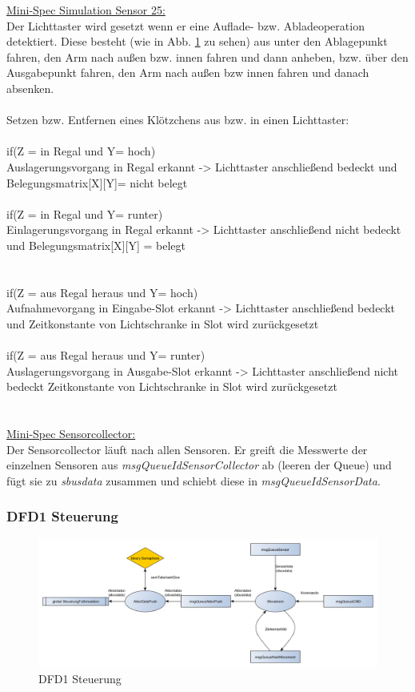 \underline{Mini-Spec Simulation Sensor 25:}\\
Der Lichttaster wird gesetzt wenn er eine Auflade- bzw. Abladeoperation detektiert. Diese besteht (wie in Abb. \ref{fig3} zu sehen) aus unter den Ablagepunkt fahren, den Arm nach außen bzw. innen fahren und dann anheben, bzw. über den Ausgabepunkt fahren, den Arm nach außen bzw innen fahren und danach absenken.\\ \\
Setzen bzw. Entfernen eines Klötzchens aus bzw. in einen Lichttaster:\\ \\
if(Z = in Regal und Y= hoch) \\
Auslagerungsvorgang in Regal erkannt -> Lichttaster anschließend bedeckt und Belegungsmatrix[X][Y]= nicht belegt\\
\\
if(Z = in Regal und Y= runter)\\
Einlagerungsvorgang in Regal erkannt -> Lichttaster anschließend nicht bedeckt und Belegungsmatrix[X][Y] = belegt \\
\\
\\
if(Z = aus Regal heraus und Y= hoch)\\
Aufnahmevorgang in Eingabe-Slot erkannt -> Lichttaster anschließend bedeckt und Zeitkonstante von Lichtschranke in Slot wird zurückgesetzt\\
\\
if(Z = aus Regal heraus und Y= runter)\\
Auslagerungsvorgang in Ausgabe-Slot erkannt -> Lichttaster anschließend nicht bedeckt  Zeitkonstante von Lichtschranke in Slot wird zurückgesetzt\ \\
\\
\\
\underline{Mini-Spec Sensorcollector:}\\
Der Sensorcollector läuft nach allen Sensoren. Er  greift die Messwerte der einzelnen Sensoren aus \textit{msgQueueIdSensorCollector} ab (leeren der Queue) und fügt sie zu \textit{sbusdata} zusammen und schiebt diese in \textit{msgQueueIdSensorData}.\\ 


\subsubsection{DFD1 Steuerung}
\begin{figure}[H]
	\centering
  \includegraphics[width=\textwidth]{DFD/dfd1_steuerung.png}
	\caption{DFD1 Steuerung}
	\label{fig3}
\end{figure}

